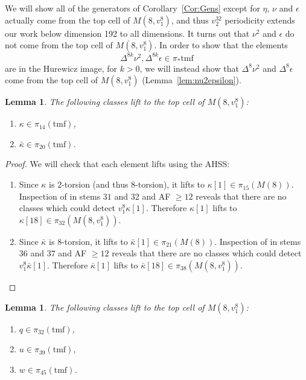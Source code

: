 \documentclass[10pt]{amsart}
\newcommand{\tmf}{\mathrm{tmf}}
\newtheorem{lem}[equation]{Lemma}
\theoremstyle{definition}
\numberwithin{equation}{section}
\numberwithin{figure}{section}
\begin{document}
We will show all of the generators of Corollary~\ref{Cor:Gens} except for $\eta$, $\nu$ and $\epsilon$ actually come from the top cell of $M(8,v_1^8)$, and thus $v_2^{32}$ periodicity extends our work below dimension 192 to all dimensions.  It turns out that $\nu^2$ and $\epsilon$ do not come from the top cell of $M(8,v_1^8)$.  In order to show that the elements  
$$ \Delta^{8k}\nu^2,  \Delta^{8k}\epsilon \in \pi_*\tmf $$
are in the Hurewicz image, for $k > 0$, we will instead show that $\Delta^8\nu^2$ and $\Delta^8\epsilon$ come from the top cell of $M(8,v_1^8)$ (Lemma~\ref{lem:nu2epsilon}). 

\begin{lem}\label{Lem:kkbLift}
The following classes lift to the top cell of $M(8,v_1^8)$:
\begin{enumerate}
\item $\kappa \in \pi_{14}(\tmf)$, 
\item $\bar{\kappa} \in \pi_{20}(\tmf)$. 
\end{enumerate}
\end{lem}

\begin{proof}
We will check that each element lifts using the AHSS:
\begin{enumerate}

\item Since $\kappa$ is $2$-torsion (and thus $8$-torsion), it lifts to $\kappa[1] \in \pi_{15}(M(8))$. Inspection of \cite[Pg. 3]{IsaksenChart} in stems $31$ and $32$ and AF $\geq 12$ reveals that there are no classes which could detect $v_1^8 \kappa[1]$. Therefore $\kappa[1]$ lifts to $\kappa[18] \in \pi_{32}(M(8,v_1^8))$. 
\vspace{10pt}

\item Since $\bar{\kappa}$ is $8$-torsion, it lifts to $\bar{\kappa}[1] \in \pi_{21}(M(8))$. Inspection of \cite[Pg. 3]{IsaksenChart} in stems $36$ and $37$ and AF $\geq 12$ reveals that there are no classes which could detect $v_1^8 \bar{\kappa}[1]$. Therefore $\bar{\kappa}[1]$ lifts to $\bar{\kappa}[18] \in \pi_{38}(M(8,v_1^8))$. 

\end{enumerate}
\end{proof}

\begin{lem}\label{Lem:quwLift}
The following classes lift to the top cell of $M(8,v_1^8)$:
\begin{enumerate}
\item $q \in \pi_{32}(\tmf)$,
\item $u \in \pi_{39}(\tmf)$,  
\item $w \in \pi_{45}(\tmf)$.
\end{enumerate}
\end{lem}
\end{document}
